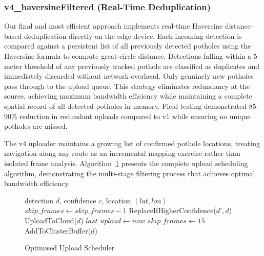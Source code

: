 \documentclass{ieeeaccess}
\begin{document}
\subsubsection{v4\_haversineFiltered (Real-Time Deduplication)}
Our final and most efficient approach implements real-time Haversine distance-based deduplication directly on the edge device. Each incoming detection is compared against a persistent list of all previously detected potholes using the Haversine formula to compute great-circle distance. Detections falling within a 5-meter threshold of any previously tracked pothole are classified as duplicates and immediately discarded without network overhead. Only genuinely new potholes pass through to the upload queue. This strategy eliminates redundancy at the source, achieving maximum bandwidth efficiency while maintaining a complete spatial record of all detected potholes in memory. Field testing demonstrated 85-90\% reduction in redundant uploads compared to v1 while ensuring no unique potholes are missed.

The v4 uploader maintains a growing list of confirmed pothole locations, treating navigation along any route as an incremental mapping exercise rather than isolated frame analysis. Algorithm~\ref{alg:upload_scheduler} presents the complete upload scheduling algorithm, demonstrating the multi-stage filtering process that achieves optimal bandwidth efficiency.

\begin{figure}[t]
\centering
\begin{algorithm}[H]
\caption{Optimised Upload Scheduler}
\label{alg:upload_scheduler}
\begin{algorithmic}[1]
\Require detection $d$, confidence $c$, location $(lat, lon)$
  \State {}
\EndIf
{}
  \State $skip\_frames \gets skip\_frames - 1$
  \State {}
\EndIf
{}
  \State {}
\EndIf
{}
    \State ReplaceIfHigherConfidence($d', d$)
    \State {}
  \EndIf
\EndFor
\State UploadToCloud($d$)
\State $last\_upload \gets now$
\State $skip\_frames \gets 15$
\State AddToClusterBuffer($d$)
\end{algorithmic}
\end{algorithm}
\end{figure}
\end{document}
